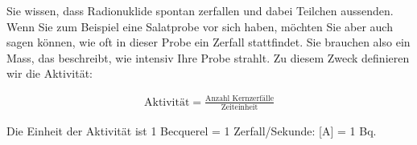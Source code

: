 \documentclass[12pt,a4paper,twoside]{article}
\begin{document}
Sie wissen, dass Radionuklide spontan zerfallen und dabei Teilchen aussenden. 
Wenn Sie zum Beispiel eine Salatprobe vor sich haben, 
möchten Sie aber auch sagen können, wie oft in dieser Probe ein Zerfall stattfindet.
Sie brauchen also ein Mass, das beschreibt, wie intensiv Ihre Probe strahlt. Zu diesem Zweck definieren wir die Aktivität:


\begin{eqnarray*}
	\text{Aktivität}=\frac{\text{Anzahl Kernzerfälle}}{\text{Zeiteinheit}}
\end{eqnarray*}


Die Einheit der Aktivität ist 1 Becquerel = 1 Zerfall/Sekunde: [A] = 1 Bq.

\end{document}
